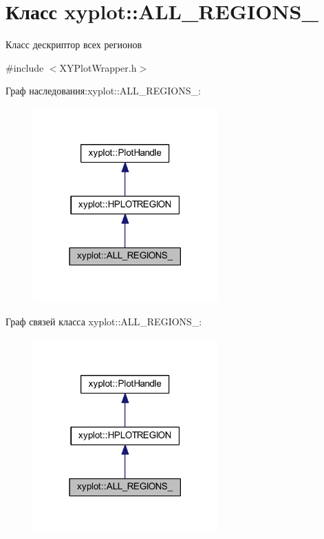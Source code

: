 \hypertarget{classxyplot_1_1_a_l_l___r_e_g_i_o_n_s__}{\section{Класс xyplot\-:\-:A\-L\-L\-\_\-\-R\-E\-G\-I\-O\-N\-S\-\_\-}
\label{classxyplot_1_1_a_l_l___r_e_g_i_o_n_s__}
}


Класс дескриптор всех регионов  




{\ttfamily \#include $<$X\-Y\-Plot\-Wrapper.\-h$>$}



Граф наследования\-:xyplot\-:\-:A\-L\-L\-\_\-\-R\-E\-G\-I\-O\-N\-S\-\_\-\-:\nopagebreak
\begin{figure}[H]
\begin{center}
\leavevmode
\includegraphics[width=201pt]{classxyplot_1_1_a_l_l___r_e_g_i_o_n_s____inherit__graph}
\end{center}
\end{figure}


Граф связей класса xyplot\-:\-:A\-L\-L\-\_\-\-R\-E\-G\-I\-O\-N\-S\-\_\-\-:\nopagebreak
\begin{figure}[H]
\begin{center}
\leavevmode
\includegraphics[width=201pt]{classxyplot_1_1_a_l_l___r_e_g_i_o_n_s____coll__graph}
\end{center}
\end{figure}
